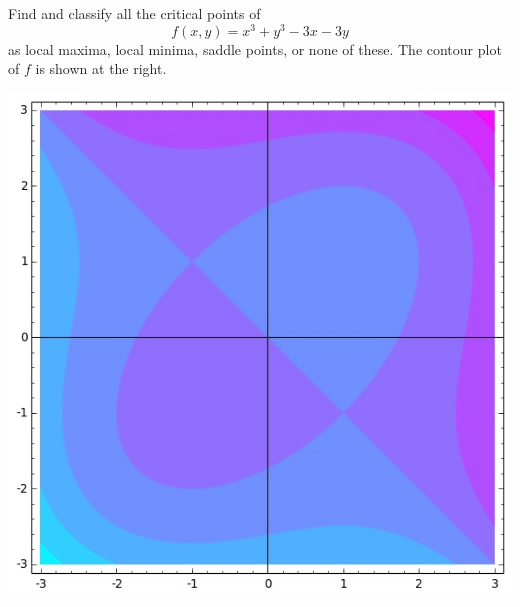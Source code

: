 \documentclass[answers,12pt,addpoints]{exam}
\begin{document}
\begin{questions}

\begin{multicols}{2}
\question[25] Find and classify all
the critical points of \[f\left(x,y\right)
=x^3+y^3-3x-3y\] as local maxima, local minima,
saddle points, or none of these.
The contour plot of $f$ is shown at the right.
\begin{center}\includegraphics[scale=.4]{Saddles}\end{center}
\end{multicols}


\end{questions}
\end{document}
